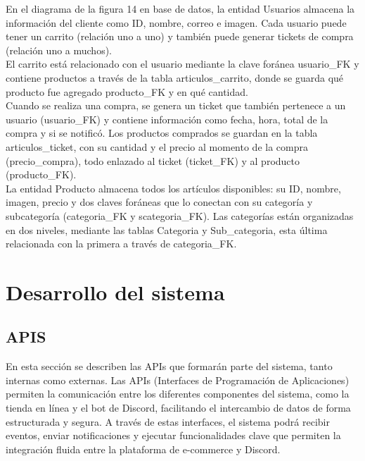 \documentclass[a4paper,12pt]{article}
\begin{document}
En el diagrama de la figura 14 en base de datos, la entidad Usuarios almacena la información del cliente como ID, nombre, correo e imagen. Cada usuario puede tener un carrito (relación uno a uno) y también puede generar tickets de compra (relación uno a muchos).\\

El carrito está relacionado con el usuario mediante la clave foránea \textnormal{usuario\_FK} y contiene productos a través de la tabla \textnormal{articulos\_carrito}, donde se guarda qué producto fue agregado \textnormal{producto\_FK} y en qué cantidad.\\

Cuando se realiza una compra, se genera un ticket que también pertenece a un usuario (\textnormal{usuario\_FK}) y contiene información como fecha, hora, total de la compra y si se notificó. Los productos comprados se guardan en la tabla \textnormal{articulos\_ticket}, con su cantidad y el precio al momento de la compra (\textnormal{precio\_compra}), todo enlazado al ticket (\textnormal{ticket\_FK}) y al producto (\textnormal{producto\_FK}).\\

La entidad Producto almacena todos los artículos disponibles: su ID, nombre, imagen, precio y dos claves foráneas que lo conectan con su categoría y subcategoría (\textnormal{categoria\_FK} y \textnormal{scategoria\_FK}). Las categorías están organizadas en dos niveles, mediante las tablas Categoria y \textnormal{Sub\_categoria}, esta última relacionada con la primera a través de \textnormal{categoria\_FK}.


\newpage

\section{Desarrollo del sistema}
\subsection{APIS}
En esta sección se describen las APIs que formarán parte del sistema, tanto internas como externas. Las APIs (Interfaces de Programación de Aplicaciones) permiten la comunicación entre los diferentes componentes del sistema, como la tienda en línea y el bot de Discord, facilitando el intercambio de datos de forma estructurada y segura. A través de estas interfaces, el sistema podrá recibir eventos, enviar notificaciones y ejecutar funcionalidades clave que permiten la integración fluida entre la plataforma de e-commerce y Discord.
\end{document}
